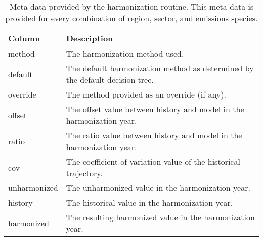 \begin{table}[]
\centering
\caption{Meta data provided by the  harmonization routine. This meta data is provided for every combination of region, sector, and emissions species.}
\label{tab:metadata}
\begin{tabular}{|p{2cm}|p{8cm}|}
\hline
Column       & Description                                                                  \\
\hline
\hline
method       & The harmonization method used.                                               \\
\hline
default      & The default harmonization method as determined by the default decision tree. \\
\hline
override     & The method provided as an override (if any).                                 \\
\hline
offset       & The offset value between history and model in the harmonization year.        \\
\hline
ratio        & The ratio value between history and model in the harmonization year.         \\
\hline
cov          & The coefficient of variation value of the historical trajectory.                           \\
\hline
unharmonized & The unharmonized value in the harmonization year.                            \\
\hline
history      & The historical value in the harmonization year.                             \\
\hline
harmonized   & The resulting harmonized value in the harmonization year.\\
\hline
\end{tabular}
\end{table}
